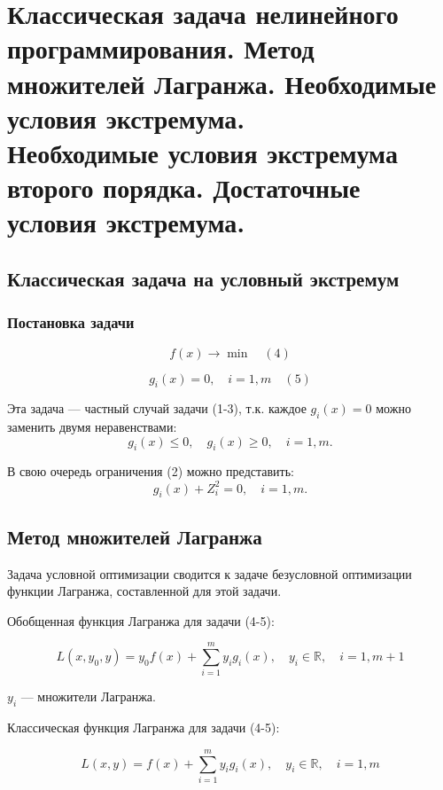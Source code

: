 \documentclass[17pt]{extarticle}
\begin{document}
\section{Классическая задача нелинейного программирования. Метод множителей Лагранжа.
  Необходимые условия экстремума. \\ Необходимые условия экстремума второго порядка.
  Достаточные условия экстремума.}

\subsection*{Классическая задача на условный экстремум}

\subsubsection*{Постановка задачи}

\[
    f(x) \rightarrow \min \quad (4)
\]

\[
    g_i(x) = 0, \quad i = 1, m \quad (5)
\]

Эта задача — частный случай задачи (1-3), т.к. каждое \( g_i(x) = 0 \) можно заменить двумя неравенствами:
\[
    g_i(x) \leq 0, \quad g_i(x) \geq 0, \quad i = 1, m.
\]

В свою очередь ограничения (2) можно представить:
\[
    g_i(x) + Z_i^2 = 0, \quad i = 1, m.
\]

\subsection*{Метод множителей Лагранжа}

Задача условной оптимизации сводится к задаче безусловной оптимизации функции Лагранжа, составленной для этой задачи.

Обобщенная функция Лагранжа для задачи (4-5):

\[
    L(x, y_0, y) = y_0 f(x) + \sum_{i=1}^m y_i g_i(x), \quad y_i \in \mathbb{R}, \quad i = 1, m + 1
\]

\( y_i \) — множители Лагранжа.

Классическая функция Лагранжа для задачи (4-5):

\[
    L(x, y) = f(x) + \sum_{i=1}^m y_i g_i(x), \quad y_i \in \mathbb{R}, \quad i = 1, m
\]
\end{document}
